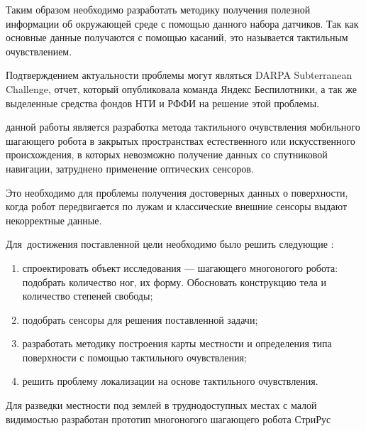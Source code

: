 Таким образом необходимо разработать методику получения полезной информации об окружающей среде с помощью данного набора датчиков. Так как основные данные получаются с помощью касаний, это называется тактильным очувствлением.

Подтверждением актуальности проблемы могут являться DARPA Subterranean Challenge, отчет, который опубликовала команда Яндекс Беспилотники, а так же выделенные средства фондов НТИ и РФФИ на решение этой проблемы.


{\aim} данной работы является разработка метода тактильного очувствления мобильного шагающего робота в закрытых пространствах естественного или искусственного происхождения, в которых невозможно получение данных со спутниковой навигации, затруднено применение оптических сенсоров.

Это необходимо для проблемы получения достоверных данных о поверхности, когда робот передвигается по лужам и классические внешние сенсоры выдают некорректные данные.

Для~достижения поставленной цели необходимо было решить следующие {\tasks}:
\begin{enumerate}[beginpenalty=10000] %
  \item спроектировать объект исследования --- шагающего многоногого робота: подобрать количество ног, их форму. Обосновать конструкцию тела и количество степеней свободы;
  \item подобрать сенсоры для решения поставленной задачи;
  \item разработать методику построения карты местности и определения типа поверхности с помощью тактильного очувствления;
  \item решить проблему локализации на основе тактильного очувствления.
\end{enumerate}

{\researchobj}
Для разведки местности под землей в труднодоступных местах с малой видимостью разработан прототип многоногого шагающего робота СтриРус 

